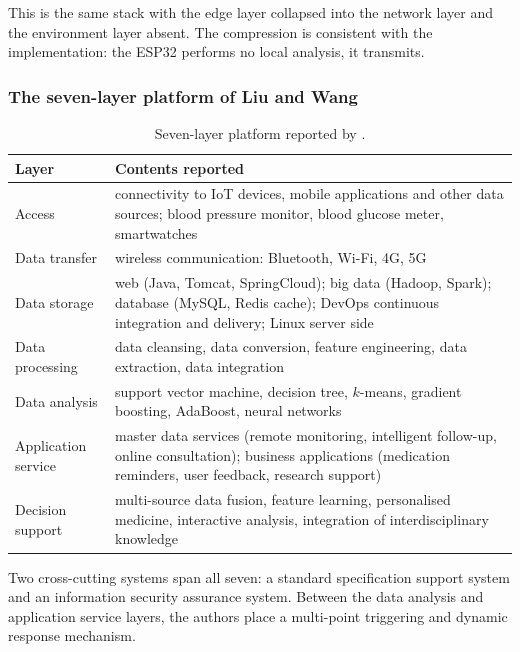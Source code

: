\documentclass[12pt,a4paper,oneside]{report}
\begin{document}
This is the same stack with the edge layer collapsed into the network layer and the environment layer absent. The compression is consistent with the implementation: the ESP32 performs no local analysis, it transmits.

\subsubsection{The seven-layer platform of Liu and Wang}

\begin{table}[htbp]
\centering\footnotesize
\caption{Seven-layer platform reported by \textcite{liu2025review}.}\label{tab:liu-layers}
\begin{tabularx}{\textwidth}{@{}>{\raggedright\arraybackslash}p{2.8cm} X@{}}
\toprule
\textbf{Layer} & \textbf{Contents reported} \\
\midrule
Access & connectivity to IoT devices, mobile applications and other data sources; blood pressure monitor, blood glucose meter, smartwatches \\
Data transfer & wireless communication: Bluetooth, Wi-Fi, 4G, 5G \\
Data storage & web (Java, Tomcat, SpringCloud); big data (Hadoop, Spark); database (MySQL, Redis cache); DevOps continuous integration and delivery; Linux server side \\
Data processing & data cleansing, data conversion, feature engineering, data extraction, data integration \\
Data analysis & support vector machine, decision tree, $k$-means, gradient boosting, AdaBoost, neural networks \\
Application service & master data services (remote monitoring, intelligent follow-up, online consultation); business applications (medication reminders, user feedback, research support) \\
Decision support & multi-source data fusion, feature learning, personalised medicine, interactive analysis, integration of interdisciplinary knowledge \\
\bottomrule
\end{tabularx}
\end{table}

Two cross-cutting systems span all seven: a standard specification support system and an information security assurance system. Between the data analysis and application service layers, the authors place a multi-point triggering and dynamic response mechanism.
\end{document}
